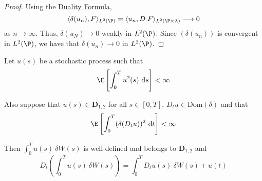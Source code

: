 \begin{proof}
	Using the \hyperref[thm:duality_formula]{Duality Formula}, 
	$$
	\langle \delta(u_n), F \rangle_{L^2(\P)} = \langle u_n, D_{\cdot} F \rangle_{L^2(\P \times \lambda)} \longrightarrow 0
	$$
	as $n \to \infty$. Thus, $\delta(u_N) \to 0$ weakly in $L^2(\P)$. Since $(\delta(u_n))$ is convergent in $L^2(\P)$, we have that $\delta(u_n) \to 0$ in $L^2(\P)$.
\end{proof}

\begin{theorem}\label{thm:ftc}
	Let $u(s)$ be a stochastic process such that $$\E\left[ \int_0^T u^2(s) ~\mathrm{d}s \right] < \infty$$

	Also suppose that $u(s) \in \mathbf{D}_{1,2}$ for all $s \in [0,T]$, $D_t u \in \text{Dom}(\delta)$ and that $$\E\left[ \int_0^T (\delta(D_tu))^2 ~\mathrm{d}t \right] < \infty$$

	Then $\int_0^T u(s)~\delta W(s)$ is well-defined and belongs to $\mathbf{D}_{1,2}$ and 
	$$
	D_t \left( \int_0^T u(s)~\delta W(s) \right) = \int_0^T D_t u(s) ~\delta W(s) + u(t)
	$$
\end{theorem}

